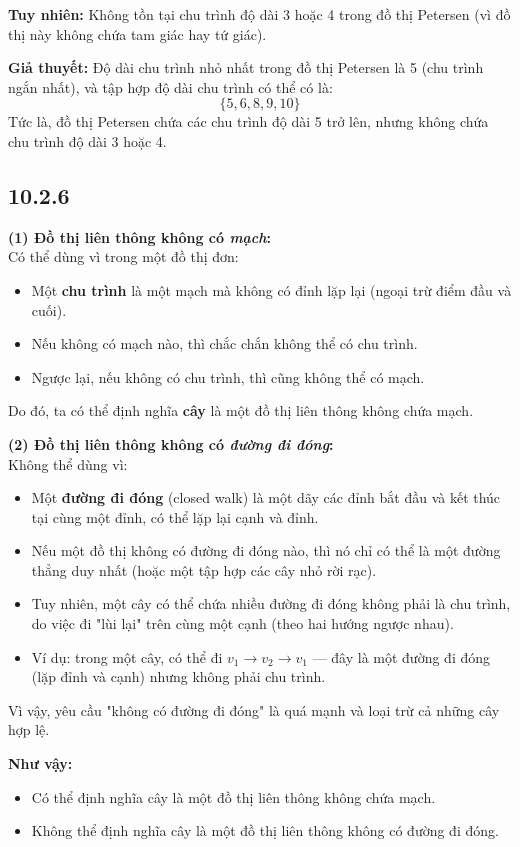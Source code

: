 \documentclass{article}
\begin{document}
	\textbf{Tuy nhiên:} Không tồn tại chu trình độ dài 3 hoặc 4 trong đồ thị Petersen (vì đồ thị này không chứa tam giác hay tứ giác).
	
	\vspace{1em}
	\textbf{Giả thuyết:} Độ dài chu trình nhỏ nhất trong đồ thị Petersen là 5 (chu trình ngắn nhất), và tập hợp độ dài chu trình có thể có là:
	\[
	\boxed{\{5, 6, 8, 9, 10\}}
	\]
	Tức là, đồ thị Petersen chứa các chu trình độ dài 5 trở lên, nhưng không chứa chu trình độ dài 3 hoặc 4.
	
	\subsection*{10.2.6}
	\textbf{(1) Đồ thị liên thông không có \textit{mạch}:} \\
	Có thể dùng vì trong một đồ thị đơn:
	\begin{itemize}
		\item Một \textbf{chu trình} là một mạch mà không có đỉnh lặp lại (ngoại trừ điểm đầu và cuối).
		\item Nếu không có mạch nào, thì chắc chắn không thể có chu trình.
		\item Ngược lại, nếu không có chu trình, thì cũng không thể có mạch.
	\end{itemize}
	Do đó, ta có thể định nghĩa \textbf{cây} là một đồ thị liên thông không chứa mạch.
	
	\textbf{(2) Đồ thị liên thông không có \textit{đường đi đóng}:} \\
	Không thể dùng vì:
	\begin{itemize}
		\item Một \textbf{đường đi đóng} (closed walk) là một dãy các đỉnh bắt đầu và kết thúc tại cùng một đỉnh, có thể lặp lại cạnh và đỉnh.
		\item Nếu một đồ thị không có đường đi đóng nào, thì nó chỉ có thể là một đường thẳng duy nhất (hoặc một tập hợp các cây nhỏ rời rạc).
		\item Tuy nhiên, một cây có thể chứa nhiều đường đi đóng không phải là chu trình, do việc đi "lùi lại" trên cùng một cạnh (theo hai hướng ngược nhau).
		\item Ví dụ: trong một cây, có thể đi $v_1 \to v_2 \to v_1$ — đây là một đường đi đóng (lặp đỉnh và cạnh) nhưng không phải chu trình.
	\end{itemize}
	Vì vậy, yêu cầu "không có đường đi đóng" là quá mạnh và loại trừ cả những cây hợp lệ.
	
	\vspace{1em}
	\noindent \textbf{Như vậy:}
	\begin{itemize}
		\item Có thể định nghĩa cây là một đồ thị liên thông không chứa mạch.
		\item Không thể định nghĩa cây là một đồ thị liên thông không có đường đi đóng.
	\end{itemize}
	
\end{document}
